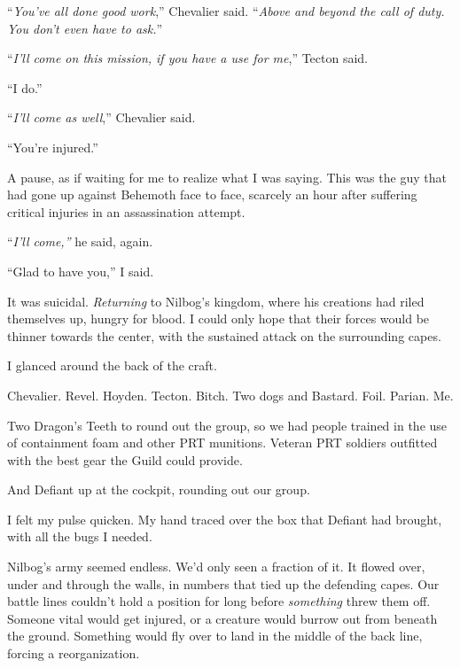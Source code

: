 ``\emph{You've all done good work},'' Chevalier said.  ``\emph{Above and beyond the call of duty.  You don't even have to ask.}''



``\emph{I'll come on this mission, if you have a use for me},'' Tecton said.



``I do.''



``\emph{I'll come as well},'' Chevalier said.



``You're injured.''



A pause, as if waiting for me to realize what I was saying.  This was the guy that had gone up against Behemoth face to face, scarcely an hour after suffering critical injuries in an assassination attempt.



``\emph{I'll come,'' }he said, again.



``Glad to have you,'' I said.



\blacksquare



It was suicidal.  \emph{Returning }to Nilbog's kingdom, where his creations had riled themselves up, hungry for blood.  I could only hope that their forces would be thinner towards the center, with the sustained attack on the surrounding capes.



I glanced around the back of the craft.



Chevalier.  Revel.  Hoyden.  Tecton.  Bitch.  Two dogs and Bastard.  Foil.  Parian.  Me.



Two Dragon's Teeth to round out the group, so we had people trained in the use of containment foam and other PRT munitions.  Veteran PRT soldiers outfitted with the best gear the Guild could provide.



And Defiant up at the cockpit, rounding out our group.



I felt my pulse quicken.  My hand traced over the box that Defiant had brought, with all the bugs I needed.



Nilbog's army seemed endless.  We'd only seen a fraction of it.  It flowed over, under and through the walls, in numbers that tied up the defending capes.  Our battle lines couldn't hold a position for long before \emph{something} threw them off.  Someone vital would get injured, or a creature would burrow out from beneath the ground.  Something would fly over to land in the middle of the back line, forcing a reorganization.



